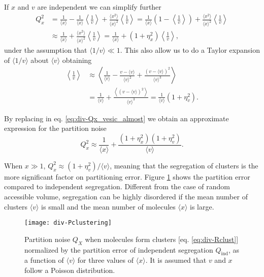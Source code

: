 If $x$ and $v$ are independent we can simplify further
\begin{equation}
  \label{eq:div-Qx_vesic_almost}
  \begin{split}
    Q_x^2 &= \frac{1}{\langle x\rangle} - \frac{1}{\langle x\rangle}\left\langle\frac{1}{v}\right\rangle + \frac{\langle x^2\rangle}{\langle x\rangle^2}\left\langle\frac{1}{v}\right\rangle = \frac{1}{\langle x\rangle}\left(1-\left\langle\frac{1}{v}\right\rangle\right)+\frac{\langle x^2\rangle}{\langle x\rangle^2}\left\langle\frac{1}{v}\right\rangle\\
  &\approx \frac{1}{\langle x\rangle} + \frac{\langle x^2\rangle}{\langle x\rangle^2}\left\langle\frac{1}{v}\right\rangle = \frac{1}{\langle x\rangle} + \left(1+\eta_x^2\right)\left\langle\frac{1}{v}\right\rangle,
  \end{split}
\end{equation}
under the assumption that $\langle 1/v\rangle \ll 1$. This also allow us to do a Taylor expansion of $\langle 1/v\rangle$ about $\langle v\rangle$ obtaining
\begin{equation*}
  \begin{split}
    \left\langle\frac{1}{v}\right\rangle &\approx \left\langle \frac{1}{\langle v\rangle} - \frac{v-\langle v\rangle}{\langle v\rangle^2} + \frac{(v-\langle v\rangle)^2}{\langle v\rangle^3}\right\rangle\\
    &=\frac{1}{\langle v\rangle} + \frac{\left\langle(v-\langle v\rangle)^2\right\rangle}{\langle v\rangle^3} = \frac{1}{\langle v\rangle}\left(1+\eta_v^2\right).
  \end{split}
\end{equation*}

By replacing in eq. \eqref{eq:div-Qx_vesic_almost} we obtain an approximate expression for the partition noise
\begin{equation}
  \label{eq:div-Rclust}
  Q_x^2 \approx \frac{1}{\langle x\rangle} + \frac{(1+\eta_x^2)(1+\eta_v^2)}{\langle v\rangle}.
\end{equation}

When $x\gg 1$, $Q_x^2\approx(1+\eta_v^2)/\langle v\rangle$, meaning that the segregation of clusters is the more significant factor on partitioning error. Figure \ref{fig:div-Pclustering} shows the partition error compared to independent segregation. Different from the case of random accessible volume, segregation can be highly disordered if the mean number of clusters $\langle v\rangle$ is small and the mean number of molecules $\langle x\rangle$ is large.
\begin{figure}[H]
  \centering
  \texttt{[image: div-Pclustering]}
  \caption[Partition noise when molecules form clusters as a function of the mean number of clusters]{\label{fig:div-Pclustering} Partition noise $Q_X$ when molecules form clusters [eq. \eqref{eq:div-Rclust}] normalized by the partition error of independent segregation $Q_\text{ind}$, as a function of $\langle v\rangle$ for three values of $\langle x\rangle$. It is assumed that $v$ and $x$ follow a Poisson distribution.}
\end{figure}

